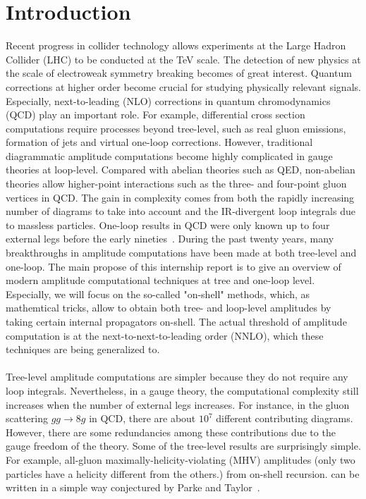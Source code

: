 \section{Introduction}
Recent progress in collider technology allows experiments at the Large Hadron Collider (LHC) to be conducted at the TeV scale.
The detection of new physics at the scale of electroweak symmetry breaking becomes of great interest. 
Quantum corrections at higher order become crucial for studying physically relevant signals. 
Especially, next-to-leading (NLO) corrections in quantum chromodynamics (QCD) play an important role. 
For example, differential cross section computations require processes beyond tree-level, such as real gluon emissions, formation of jets and virtual one-loop corrections.
However, traditional diagrammatic amplitude computations become highly complicated in gauge theories at loop-level.
Compared with abelian theories such as QED, non-abelian theories allow higher-point interactions such as the three- and four-point gluon vertices in QCD.
The gain in complexity comes from both the rapidly increasing number of diagrams to take into account and the IR-divergent loop integrals due to massless particles.  
One-loop results in QCD were only known up to four external legs before the early nineties~\cite{Bern:1994zx}. 
During the past twenty years, many breakthroughs in amplitude computations have been made at both tree-level and one-loop.
The main propose of this internship report is to give an overview of modern amplitude computational techniques at tree and one-loop level.
Especially, we will focus on the so-called "on-shell" methods, which, as mathemtical tricks, allow to obtain both tree- and loop-level amplitudes by taking certain internal propagators on-shell.  
The actual threshold of amplitude computation is at the next-to-next-to-leading order (NNLO), which these techniques are being generalized to.
\\\\
Tree-level amplitude computations are simpler because they do not require any loop integrals.
Nevertheless, in a gauge theory, the computational complexity still increases when the number of external legs increases.
For instance, in the gluon scattering $gg\rightarrow 8g$ in QCD, there are about $10^7$ different contributing diagrams.
However, there are some redundancies among these contributions due to the gauge freedom of the theory.
Some of the tree-level results are surprisingly simple.
For example, all-gluon maximally-helicity-violating (MHV) amplitudes (\ie only two particles have a helicity different from the others.) from on-shell recursion. can be written in a simple way conjectured by Parke and Taylor~\cite{PhysRevLett.56.2459}.
